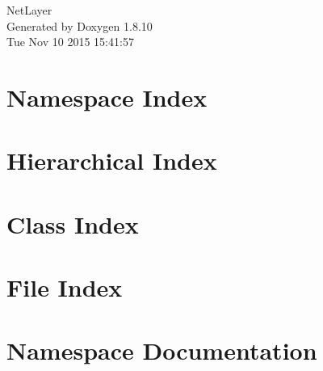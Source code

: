 \documentclass[twoside]{book}
\newcommand{\+}{\discretionary{\mbox{\scriptsize$\hookleftarrow$}}{}{}}
\newcommand{\clearemptydoublepage}{%
  \newpage{\pagestyle{empty}\cleardoublepage}%
}
\begin{document}
\hypersetup{pageanchor=false,
             bookmarks=true,
             bookmarksnumbered=true,
             pdfencoding=unicode
            }
\begin{titlepage}
\vspace*{7cm}
\begin{center}%
{\Large Net\+Layer }\\
\vspace*{1cm}
{\large Generated by Doxygen 1.8.10}\\
\vspace*{0.5cm}
{\small Tue Nov 10 2015 15:41:57}\\
\end{center}
\end{titlepage}
\clearemptydoublepage
\tableofcontents
\clearemptydoublepage
{}
\hypersetup{pageanchor=true}

\chapter{Namespace Index}

\chapter{Hierarchical Index}

\chapter{Class Index}

\chapter{File Index}


\chapter{Namespace Documentation}




















\end{document}
